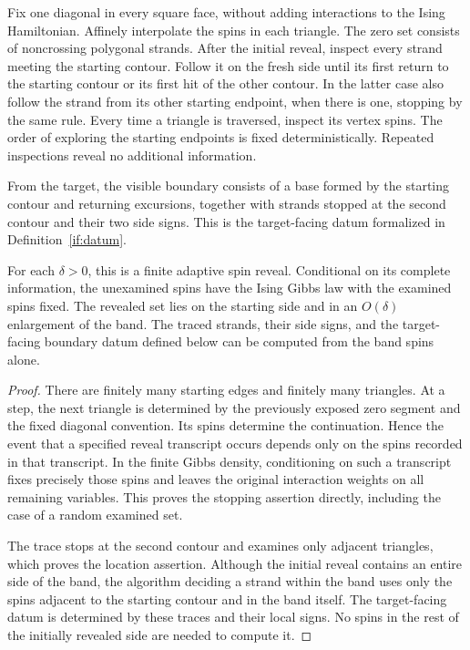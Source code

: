Fix one diagonal in every square face, without adding interactions to
the Ising Hamiltonian.  Affinely interpolate the spins in each triangle.
The zero set consists of noncrossing polygonal strands.  After the initial
reveal, inspect every strand meeting the starting contour.  Follow it on
the fresh side until its first return to the starting contour or its
first hit of the other contour.  In the latter case also follow the
strand from its other starting endpoint, when there is one, stopping by
the same rule.  Every time a triangle is traversed, inspect its vertex
spins.  The order of exploring the starting endpoints is fixed
deterministically.  Repeated inspections reveal no additional information.

From the target, the visible boundary consists of a base formed by the
starting contour and returning excursions, together with strands stopped
at the second contour and their two side signs. This is the
target-facing datum formalized in Definition~\ref{if:datum}.

\begin{lemma}\label{if:stopping}
For each $\delta>0$, this is a finite adaptive spin reveal.  Conditional
on its complete information, the unexamined spins have the Ising Gibbs
law with the examined spins fixed.  The revealed set lies on the starting
side and in an $O(\delta)$ enlargement of the band.  The traced strands,
their side signs, and the target-facing boundary datum defined below
can be computed from the band spins alone.
\end{lemma}

\begin{proof}
There are finitely many starting edges and finitely many triangles.
At a step, the next triangle is determined by the previously exposed
zero segment and the fixed diagonal convention.  Its spins determine
the continuation.  Hence the event that a specified reveal transcript
occurs depends only on the spins recorded in that transcript.  In the
finite Gibbs density, conditioning on such a transcript fixes precisely
those spins and leaves the original interaction weights on all remaining
variables.  This proves the stopping assertion directly, including the
case of a random examined set.

The trace stops at the second contour and examines only adjacent
triangles, which proves the location assertion.  Although the initial
reveal contains an entire side of the band, the algorithm deciding a
strand within the band uses only the spins adjacent to the starting
contour and in the band itself.  The target-facing datum is determined
by these traces and their local signs.  No spins in the rest of the
initially revealed side are needed to compute it.
\end{proof}

